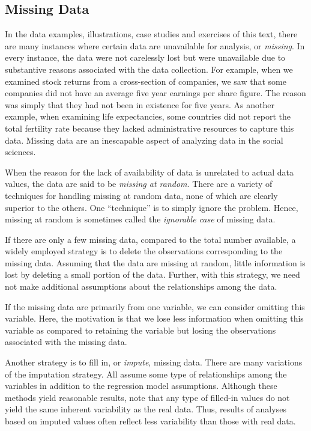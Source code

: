\linejed

\subsection{Missing Data}

In the data examples, illustrations, case studies and exercises of
this text, there are many instances where certain data are
unavailable for analysis, or \textit{missing}. In every instance,
the data were not carelessly lost but were unavailable due to
substantive reasons associated with the data collection. For
example, when we examined stock returns from a cross-section of
companies, we saw that some companies did not have an average five
year earnings per share figure. The reason was simply that they had
not been in existence for five years. As another example, when
examining life expectancies, some countries did not report the total
fertility rate because they lacked administrative resources to
capture this data. Missing data are an inescapable aspect of
analyzing data in the social sciences.

When the reason for the lack of availability of data is unrelated to
actual data values, the data are said to be \textit{missing at
random}. There are a variety of techniques for handling missing at
random data, none of which are clearly superior to the others. One
``technique'' is to simply ignore the problem. Hence, missing at
random is sometimes called the \textit{ignorable case} of missing
data.

If there are only a few missing data, compared to the total number
available, a widely employed strategy is to delete the observations
corresponding to the missing data. Assuming that the data are
missing at random, little information is lost by deleting a small
portion of the data. Further, with this strategy, we need not make
additional assumptions about the relationships among the data.

If the missing data are primarily from one variable, we can consider
omitting this variable. Here, the motivation is that we lose less
information when omitting this variable as compared to retaining the
variable but losing the observations associated with the missing
data.

Another strategy is to fill in, or \textit{impute}, missing data.
There are many variations of the imputation strategy. All assume
some type of relationships among the variables in addition to the
regression model assumptions. Although these methods yield
reasonable results, note that any type of filled-in values do not
yield the same inherent variability as the real data. Thus, results
of analyses based on imputed values often reflect less variability
than those with real data.

